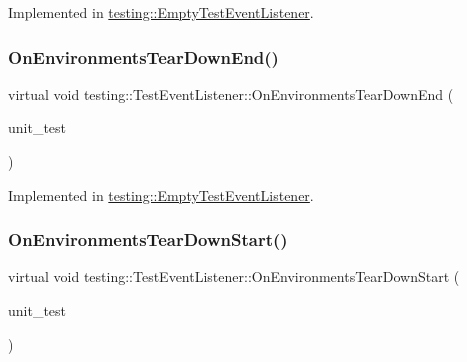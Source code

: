 Implemented in \mbox{\hyperlink{classtesting_1_1_empty_test_event_listener_a156d1965248fbdced6aabacadfa2d63f}{testing\+::\+Empty\+Test\+Event\+Listener}}.

\mbox{\label{classtesting_1_1_test_event_listener_a9ea04fa7f447865ba76df35e12ba2092}} 
\subsubsection{\texorpdfstring{OnEnvironmentsTearDownEnd()}{OnEnvironmentsTearDownEnd()}}
{\footnotesize\ttfamily virtual void testing\+::\+Test\+Event\+Listener\+::\+On\+Environments\+Tear\+Down\+End (\begin{DoxyParamCaption}\item[{const \mbox{\hyperlink{classtesting_1_1_unit_test}{Unit\+Test}} \&}]{unit\+\_\+test }\end{DoxyParamCaption})\hspace{0.3cm}{\ttfamily [pure virtual]}}



Implemented in \mbox{\hyperlink{classtesting_1_1_empty_test_event_listener_aea64c83c415b33a4c0b0239bafd1438d}{testing\+::\+Empty\+Test\+Event\+Listener}}.

\mbox{\label{classtesting_1_1_test_event_listener_a468b5e6701bcb86cb2c956caadbba5e4}} 
\subsubsection{\texorpdfstring{OnEnvironmentsTearDownStart()}{OnEnvironmentsTearDownStart()}}
{\footnotesize\ttfamily virtual void testing\+::\+Test\+Event\+Listener\+::\+On\+Environments\+Tear\+Down\+Start (\begin{DoxyParamCaption}\item[{const \mbox{\hyperlink{classtesting_1_1_unit_test}{Unit\+Test}} \&}]{unit\+\_\+test }\end{DoxyParamCaption})\hspace{0.3cm}{\ttfamily [pure virtual]}}



